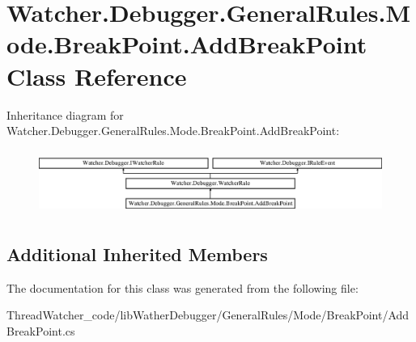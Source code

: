 \hypertarget{class_watcher_1_1_debugger_1_1_general_rules_1_1_mode_1_1_break_point_1_1_add_break_point}{\section{Watcher.\+Debugger.\+General\+Rules.\+Mode.\+Break\+Point.\+Add\+Break\+Point Class Reference}
\label{class_watcher_1_1_debugger_1_1_general_rules_1_1_mode_1_1_break_point_1_1_add_break_point}
}
Inheritance diagram for Watcher.\+Debugger.\+General\+Rules.\+Mode.\+Break\+Point.\+Add\+Break\+Point\+:\begin{figure}[H]
\begin{center}
\leavevmode
\includegraphics[height=2.121212cm]{class_watcher_1_1_debugger_1_1_general_rules_1_1_mode_1_1_break_point_1_1_add_break_point}
\end{center}
\end{figure}
\subsection*{Additional Inherited Members}


The documentation for this class was generated from the following file\+:\begin{DoxyCompactItemize}
\item 
Thread\+Watcher\+\_\+code/lib\+Wather\+Debugger/\+General\+Rules/\+Mode/\+Break\+Point/Add\+Break\+Point.\+cs\end{DoxyCompactItemize}
